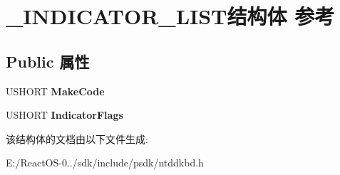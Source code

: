 \hypertarget{struct___i_n_d_i_c_a_t_o_r___l_i_s_t}{}\section{\+\_\+\+I\+N\+D\+I\+C\+A\+T\+O\+R\+\_\+\+L\+I\+S\+T结构体 参考}
\label{struct___i_n_d_i_c_a_t_o_r___l_i_s_t}
\subsection*{Public 属性}
\begin{DoxyCompactItemize}
\item 
\mbox{\label{struct___i_n_d_i_c_a_t_o_r___l_i_s_t_acccf053ddceeceba5aad8ed31e046211}} 
U\+S\+H\+O\+RT {\bfseries Make\+Code}
\item 
\mbox{\label{struct___i_n_d_i_c_a_t_o_r___l_i_s_t_aa41ed774b953b7054b68e0f5e9985f4b}} 
U\+S\+H\+O\+RT {\bfseries Indicator\+Flags}
\end{DoxyCompactItemize}


该结构体的文档由以下文件生成\+:\begin{DoxyCompactItemize}
\item 
E\+:/\+React\+O\+S-\/0../sdk/include/psdk/ntddkbd.\+h\end{DoxyCompactItemize}
